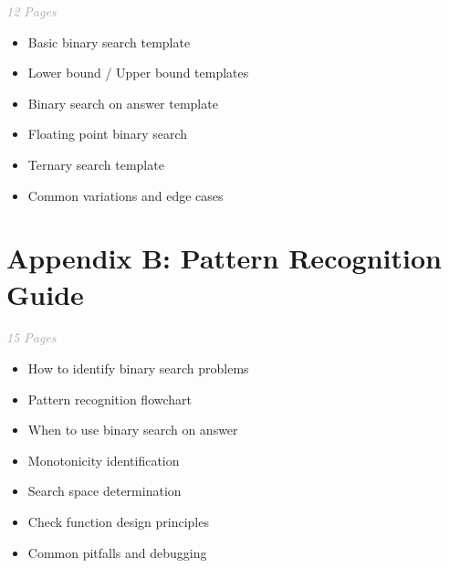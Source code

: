 \documentclass[11pt,a4paper,oneside]{book}
\begin{document}
\begin{tcolorbox}[
    enhanced,
    colback=white,
    colframe=primaryblue,
    boxrule=1.5pt,
    arc=3mm
]
\textit{\textcolor{darkgray}{12 Pages}}
\end{tcolorbox}

\vspace{0.3cm}

\begin{itemize}[leftmargin=*, itemsep=5pt]
    \item[\textcolor{successgreen}{$\bullet$}] Basic binary search template
    \item[\textcolor{successgreen}{$\bullet$}] Lower bound / Upper bound templates
    \item[\textcolor{successgreen}{$\bullet$}] Binary search on answer template
    \item[\textcolor{successgreen}{$\bullet$}] Floating point binary search
    \item[\textcolor{successgreen}{$\bullet$}] Ternary search template
    \item[\textcolor{successgreen}{$\bullet$}] Common variations and edge cases
\end{itemize}

\section*{Appendix B: Pattern Recognition Guide}

\begin{tcolorbox}[
    enhanced,
    colback=white,
    colframe=primaryblue,
    boxrule=1.5pt,
    arc=3mm
]
\textit{\textcolor{darkgray}{15 Pages}}
\end{tcolorbox}

\vspace{0.3cm}

\begin{itemize}[leftmargin=*, itemsep=5pt]
    \item[\textcolor{successgreen}{$\bullet$}] How to identify binary search problems
    \item[\textcolor{successgreen}{$\bullet$}] Pattern recognition flowchart
    \item[\textcolor{successgreen}{$\bullet$}] When to use binary search on answer
    \item[\textcolor{successgreen}{$\bullet$}] Monotonicity identification
    \item[\textcolor{successgreen}{$\bullet$}] Search space determination
    \item[\textcolor{successgreen}{$\bullet$}] Check function design principles
    \item[\textcolor{successgreen}{$\bullet$}] Common pitfalls and debugging
\end{itemize}
\end{document}
